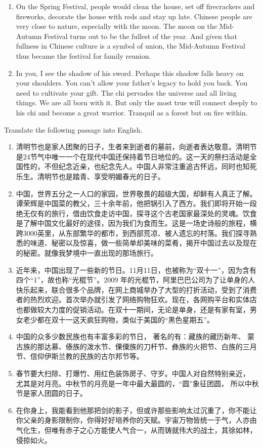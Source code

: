 \begin{problem}
\begin{enumerate}
        \item On the Spring Festival, people would clean the house, set off firecrackers and fireworks, decorate the house with reds and stay up late. Chinese people are very close to nature, especially with the moon. The moon on the Mid-Autumn Festival turns out to be the fullest of the year. And given that fullness in Chinese culture is a symbol of union, the Mid-Autumn Festival thus became the festival for family reunion.
        \item In you, I see the shadow of his sword. Perhaps this shadow falls heavy on your shoulders. You can't allow your father's legacy to hold you back. You need to cultivate your gift. The chi pervades the universe and all living things. We are all born with it. But only the most true will connect deeply to his chi and become a great warrior. Tranquil as a forest but on fire within.
    \end{enumerate}
\end{problem}

\begin{problem}
    Translate the following passage into English.
    \begin{enumerate}
        \item 清明节也是家人团聚的日子，生者来到逝者的墓前，向逝者表达敬意。清明节是24节气中唯一一个在现代中国还保持着节日地位的。这一天的祭扫活动是全国性的，不但纪念近亲，也纪念先人。中国人非常注重追古怀远，同时也知死乐生。清明节也是踏青、享受明媚春光的日子。
        \item 中国，世界五分之一人口的家园，世界敬畏的超级大国，却鲜有人真正了解。谭荣辉是中国菜的教父，三十余年前，他把锅引入了西方。我们即将开始一段绝无仅有的旅行，借由饮食走访中国，探寻这个古老国家最深处的灵魂。饮食是了解中国文化最好的途径，因为我们为食而生。这是一场史诗般的旅程，横跨3000英里，从东部繁华的都市，到西部荒凉、被人遗忘的村落。我们探寻熟悉的味道、秘密以及惊喜，做一些简单却美味的菜肴，揭开中国过去以及现在的秘密。就像我梦境中一直出现的那场旅行。
        \item 近年来，中国出现了一些新的节日。11月11日，也被称为“双十一”，因为含有四个“1”，故也称“光棍节”。2009 年的光棍节，阿里巴巴公司为了让单身的人快乐起来，联合很多个品牌，在网上商城举办了大型的打折活动，受到了消费者的热烈欢迎。首次举办就引发了网络购物狂欢。现在，各网购平台和实体店也都做较大力度的促销活动。在双十一期间，无论是单身，还是有家有室，男女老少都在双十一这天疯狂购物，类似于美国的“黑色星期五”。
        \item 中国的众多少数民族也有丰富多彩的节日， 著名的有：藏族的藏历新年、 蒙古族的那达慕、傣族的泼水节、傈僳族的刀杆节、彝族的火把节、白族的三月节、信仰伊斯兰教的民族的古尔邦节等。
        \item 春节要大扫除、打爆竹、用红色装饰房子、守岁。中国人对自然特别亲近， 尤其是对月亮。中秋节的月亮是一年中最大最圆的，“圆”象征团圆， 所以中秋节是家人团圆的日子。
        \item 在你身上，我能看到他那把剑的影子，但或许那些影响太过沉重了，你不能让你父亲的身影限制你，你得好好培养你的天赋。宇宙万物皆统一于气，人亦由气化生，但唯有赤子之心方能使人气合一，从而铸就伟大的战士，其徐如林，侵掠如火。
    \end{enumerate}
\end{problem}